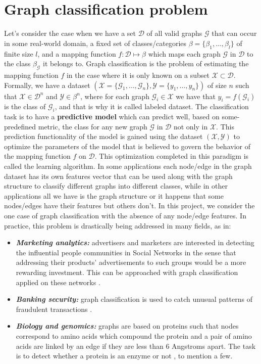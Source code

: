 \section{Graph classification problem}
\label{sec:Graph_classification_problem}
Let's consider the case when we have a set $\mathcal{D}$ of all valid graphs $\mathcal{G}$ that can occur in some real-world domain, a fixed set of classes/categories $\beta=\{\beta _1,\ldots,\beta _l\}$ of finite size $l$, and a mapping function $f:\mathcal{D}\mapsto\beta$ which maps each graph $\mathcal{G}$ in $\mathcal{D}$ to the class $\beta_\mathcal{G}$ it belongs to. Graph classification is the problem of estimating the mapping function $f$ in the case where it is only known on a subset $\mathcal{X}\subset \mathcal{D}$. Formally, we have a dataset $(\mathcal{X}=\{\mathcal{G}_1,\ldots,\mathcal{G}_n\}, \mathcal{Y}=\{y_1,\ldots,y_n\})$ of size $n$ such that $\mathcal{X}\in \mathcal{D}^n$ and $\mathcal{Y}\in\beta^n$, where for each graph $\mathcal{G}_i\in \mathcal{X}$ we have that $y_i=f(\mathcal{G}_i)$ is the class of $\mathcal{G}_i$, and that is why it is called labeled dataset. The classification task is to have a \textbf{predictive model} which can predict well, based on some-predefined metric,  the class for any new graph $\mathcal{G}$ in $\mathcal{D}$ not only in $\mathcal{X}$. This prediction functionality of the model is gained using the dataset $(\mathcal{X}, \mathcal{Y})$ to optimize the parameters of the model that is believed to govern the behavior of the mapping function $f$ on $\mathcal{D}$. This optimization completed in this paradigm is called the learning algorithm.\newline
In some applications each node/edge in the graph dataset has its own features vector that can be used along with the graph structure to classify different graphs into different classes, while in other applications all we have is the graph structure or it happens that some nodes/edges have their features but others don't. In this project, we consider the one case of graph classification with the absence of any node/edge features.
In practice, this problem is drastically being addressed in many fields, as in:
\begin{itemize}
    \item \textbf{\emph{Marketing analytics:}} advertisers and marketers  are interested in detecting the influential people communities in Social Networks in the sense that addressing their products' advertisements to such groups would be a more rewarding investment. This can be approached with graph classification applied on these networks \citep{marketing_analytics}.
    \item \textbf{\emph{Banking security:}} graph classification is used to catch unusual patterns of fraudulent transactions \citep{banking_security}.
    \item \textbf{\emph{Biology and genomics:}} graphs are based on proteins such that nodes correspond
to amino acids which compound the protein and a pair of amino acids are linked by an edge if they are less than 6 Angstroms apart. The task is to detect whether a protein is an enzyme or not \citep{protein_application}, to mention a few.
\end{itemize}

